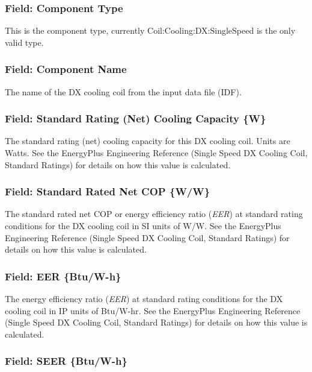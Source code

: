 \subsubsection{Field: Component Type}\label{field-component-type-3}

This is the component type, currently Coil:Cooling:DX:SingleSpeed is the only valid type.

\subsubsection{Field: Component Name}\label{field-component-name-3}

The name of the DX cooling coil from the input data file (IDF).

\subsubsection{Field: Standard Rating (Net) Cooling Capacity \{W\}}\label{field-standard-rating-net-cooling-capacity-w}

The standard rating (net) cooling capacity for this DX cooling coil. Units are Watts. See the EnergyPlus Engineering Reference (Single Speed DX Cooling Coil, Standard Ratings) for details on how this value is calculated.

\subsubsection{Field: Standard Rated Net COP \{W/W\}}\label{field-standard-rated-net-cop-ww}

The standard rated net COP or energy efficiency ratio (\emph{EER}) at standard rating conditions for the DX cooling coil in SI units of W/W. See the EnergyPlus Engineering Reference (Single Speed DX Cooling Coil, Standard Ratings) for details on how this value is calculated.

\subsubsection{Field: EER \{Btu/W-h\}}\label{field-eer-btuw-h}

The energy efficiency ratio (\emph{EER}) at standard rating conditions for the DX cooling coil in IP units of Btu/W-hr. See the EnergyPlus Engineering Reference (Single Speed DX Cooling Coil, Standard Ratings) for details on how this value is calculated.

\subsubsection{Field: SEER \{Btu/W-h\}}\label{field-seer-btuw-h}


